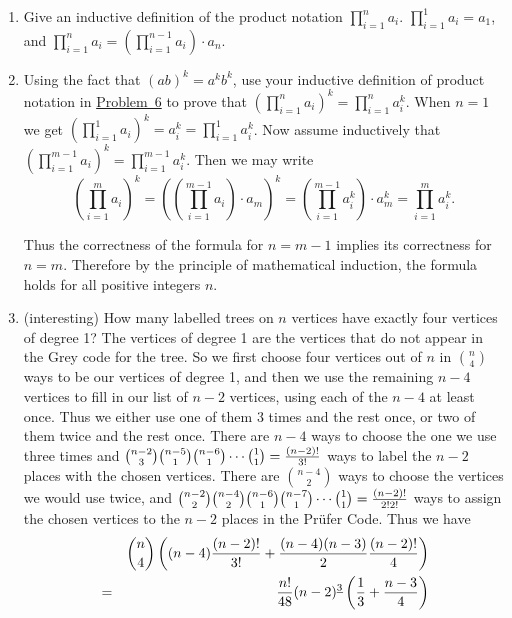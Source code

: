 \documentclass[10pt,]{book}
\theoremstyle{plain}
\theoremstyle{definition}
\numberwithin{equation}{chapter}
\newcommand{\amp}{&}
\begin{document}
\begin{enumerate}
%
\item\hypertarget{inductiveprodnotation}{}Give an inductive definition of the product notation \(\displaystyle
\prod_{i=1}^n a_i\). \(\displaystyle\prod_{i=1}^1a_i=a_1\), and \(\displaystyle\prod_{i=1}^n
a_i= \left(\prod_{i=1}^{n-1}a_i\right)\cdot a_n\).%
%
\item\hypertarget{li-44}{}Using the fact that \((ab)^k =a^kb^k\), use your inductive definition of product notation in \hyperlink{inductiveprodnotation}{Problem~6} to prove that \(\displaystyle \left(\prod_{i=1}^n a_i\right)^k=\prod_{i=1}^n a_i^k\). When \(n=1\) we get \(\displaystyle\left(\prod_{i=1}^1 a_i\right)^k=
a_i^k =\prod_{i=1}^1a_i^k\). Now assume inductively that \(\displaystyle\left(\prod_{i=1}^{m-1}a_i\right)^k=\prod_{i=1}^{m-1}a_i^k\). Then we may write%
\begin{equation*}
\left(\prod_{i=1}^ma_i\right)^k=\left(\left(\prod_{i=1}^{m-1}
a_i\right)\cdot a_m\right)^k=\left(\prod_{i=1}^{m-1}
a_i^k\right)\cdot a_m^k=\prod_{i=1}^m a_i^k.
\end{equation*}
%
\par
Thus the correctness of the formula for \(n=m-1\) implies its correctness for \(n=m\). Therefore by the principle of mathematical induction, the formula holds for all positive integers \(n\).%
%
\item\hypertarget{li-45}{}(interesting) How many labelled trees on \(n\) vertices have exactly four vertices of degree 1? The vertices of degree 1 are the vertices that do not appear in the Grey code for the tree. So we first choose four vertices out of \(n\) in \(n\choose 4\) ways to be our vertices of degree 1, and then we use the remaining \(n-4\) vertices to fill in our list of \(n-2\) vertices, using each of the \(n-4\) at least once. Thus we either use one of them 3 times and the rest once, or two of them twice and the rest once. There are \(n-4\) ways to choose the one we use three times and \({n-2\choose 3}{n-5\choose
1}{n-6\choose1}\cdots{1\choose1}={(n-2)!\over3!}\) ways to label the \(n-2\) places with the chosen vertices. There are \(n-4\choose 2\) ways to choose the vertices we would use twice, and \({n-2\choose
2}{n-4\choose2}{n-6\choose1}{n-7\choose1}\cdots {1\choose1}={(n-2)!\over 2!2!}\) ways to assign the chosen vertices to the \(n-2\) places in the Prüfer Code. Thus we have%
\begin{align*}
\amp \amp {n\choose 4}\left((n-4){(n-2)!\over 3!} +{(n-4)(n-3)\over
2}{(n-2)!\over 4}\right)\\
\amp =\amp {n!\over 48}(n-2)^{\underline{3}}\left({1\over3} +{n-3\over 4}\right)

\end{align*}
\end{enumerate}
\end{document}
